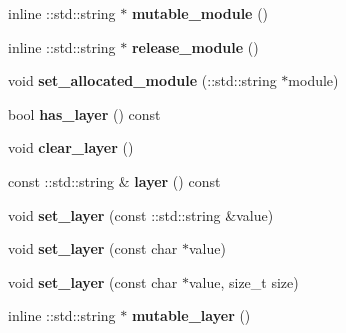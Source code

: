 \begin{DoxyCompactItemize}
inline \+::std\+::string $\ast$ {\bfseries mutable\+\_\+module} ()
\item 
\mbox{\label{classcaffe_1_1_python_parameter_a9a8384ac10bcf448861c9c161e7ce5c3}} 
inline \+::std\+::string $\ast$ {\bfseries release\+\_\+module} ()
\item 
\mbox{\label{classcaffe_1_1_python_parameter_a4062b94b90fdccf1a7a68b94de44f869}} 
void {\bfseries set\+\_\+allocated\+\_\+module} (\+::std\+::string $\ast$module)
\item 
\mbox{\label{classcaffe_1_1_python_parameter_ae2d7739570d99f0f0993ce0f82fb72f7}} 
bool {\bfseries has\+\_\+layer} () const
\item 
\mbox{\label{classcaffe_1_1_python_parameter_a193141ed915e3992453d9e6ebaf1b4a9}} 
void {\bfseries clear\+\_\+layer} ()
\item 
\mbox{\label{classcaffe_1_1_python_parameter_ae4c5e2aaa7b8586b4fe0ce80f1281226}} 
const \+::std\+::string \& {\bfseries layer} () const
\item 
\mbox{\label{classcaffe_1_1_python_parameter_aa946947c64778f40cfb6a1524ed0210f}} 
void {\bfseries set\+\_\+layer} (const \+::std\+::string \&value)
\item 
\mbox{\label{classcaffe_1_1_python_parameter_ac73e3774585bd27685df20a683af425b}} 
void {\bfseries set\+\_\+layer} (const char $\ast$value)
\item 
\mbox{\label{classcaffe_1_1_python_parameter_ae0e59c8d086913d21702a0ec48764641}} 
void {\bfseries set\+\_\+layer} (const char $\ast$value, size\+\_\+t size)
\item 
\mbox{\label{classcaffe_1_1_python_parameter_aa840fa68c0103b75501bd573f30c5fbf}} 
inline \+::std\+::string $\ast$ {\bfseries mutable\+\_\+layer} ()
\item 
\mbox{\label{classcaffe_1_1_python_parameter_a42285915bd51c1435944a2fbaa8bacd8}} 

\end{DoxyCompactItemize}
